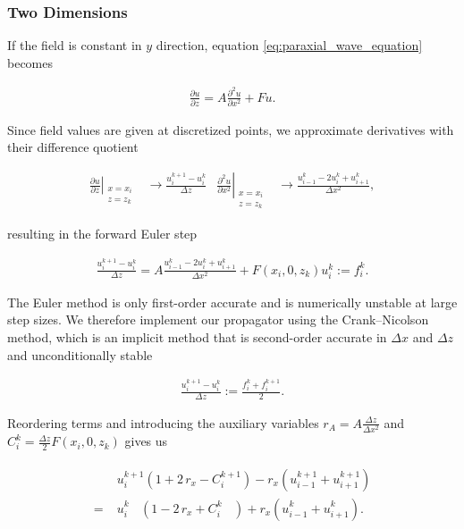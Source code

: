 

\subsubsection{Two Dimensions} \label{sec:finite_difference_propagator_2D}

If the field is constant in $y$ direction, equation  \eqref{eq:paraxial_wave_equation} becomes

\begin{align*}
\frac{\partial u}{\partial z} = A\frac{\partial^2 u}{\partial x^2} + F  u.
\end{align*}

Since field values are given at discretized points, we approximate derivatives with their difference quotient

\begin{align*}
\left. \frac{\partial u}{\partial z}  \right\rvert_{\substack{x=x_i\\z=z_k}} \! &\rightarrow \frac{u_i^{k+1} - u_i^{k}}{\Delta z} &
\left. \frac{\partial^2 u}{\partial x^2}  \right\rvert_{\substack{x=x_i\\z=z_k}} \! &\rightarrow \frac{u_{i-1}^{k} - 2 u_{i}^{k} + u_{i+1}^{k}}{\Delta x^2},
\end{align*}

resulting in the forward Euler step

\begin{align*}
\frac{u_i^{k+1} - u_i^{k}}{\Delta z} =
A \frac{u_{i-1}^{k} - 2 u_{i}^{k} + u_{i+1}^{k}}{\Delta x^2} + F(x_i,0,z_k) u_{i}^{k}  := f^k_i .
\end{align*}

The Euler method is only first-order accurate and is numerically unstable at large step sizes. We therefore implement our propagator using the Crank–Nicolson method, which is an implicit method that is second-order accurate in $\Delta x$ and $\Delta z$ and unconditionally stable~\cite{DissertationFuhse}

\begin{align*}
\frac{u_i^{k+1} - u_i^{k}}{\Delta z} := \frac{ f^k_i +  f^{k+1}_i }{2} .
\end{align*}

Reordering terms and introducing the auxiliary variables $r_A = A \frac{\Delta z}{ \Delta x^2}$ and $C_i^{k} = \frac{\Delta z}{2} F(x_i,0,z_{k})$ gives us

\begin{align} \label{eq:2D_finite_difference_equation}
\begin{split}
 & u_i^{k+1} ( 1 + 2 \, r_x - C_i^{k+1} ) - r_x ( u_{i-1}^{k+1} + u_{i+1}^{k+1} )\\
= \; &  u_i^{k \phantom{ + 1} } ( 1 - 2\,r_x + C_i^{k \phantom{ + 1} }) + r_x (u_{i-1}^{k \phantom{ + 1} } + u_{i+1}^{k \phantom{ + 1} }  ).
\end{split}
\end{align}

